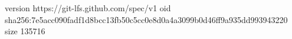 version https://git-lfs.github.com/spec/v1
oid sha256:7e5acc090fadf1d8bcc13fb50c5cc0e8d0a4a3099b0d46ff9a935dd993943220
size 135716
